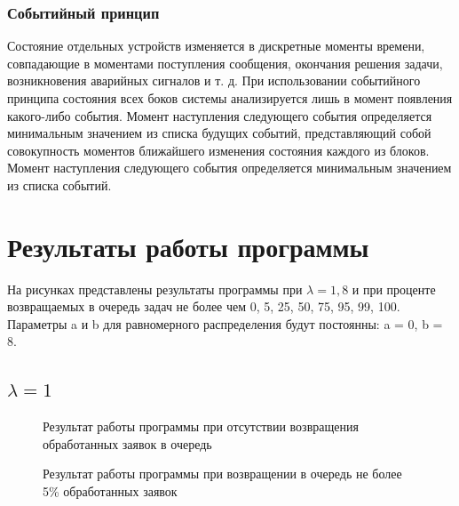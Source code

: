 \documentclass[14pt, a4paper]{extarticle}
\begin{document}
\subsubsection{Событийный принцип}

Состояние отдельных устройств изменяется в дискретные моменты времени, совпадающие в моментами поступления сообщения, окончания решения задачи, возникновения аварийных сигналов и т. д. При использовании событийного принципа состояния всех боков системы анализируется лишь в момент появления какого-либо события. Момент наступления следующего события определяется минимальным значением из списка будущих событий, представляющий собой совокупность моментов ближайшего изменения состояния каждого из блоков. Момент наступления следующего события определяется минимальным значением из списка событий.

\section{Результаты работы программы}

На рисунках представлены результаты программы при $\lambda = 1, 8$ и при проценте возвращаемых в очередь задач не более чем 0, 5, 25, 50, 75, 95, 99, 100. Параметры a и b для равномерного распределения будут постоянны: a = 0, b = 8.

\subsection{$\lambda = 1$}
\begin{figure}[H]
\caption{Результат работы программы при отсутствии возвращения обработанных заявок в очередь}
\label{fig:1_0}
\end{figure}

\begin{figure}[H]
\caption{Результат работы программы при возвращении в очередь не более 5\% обработанных заявок}
\label{fig:1_5}
\end{figure}
\end{document}

